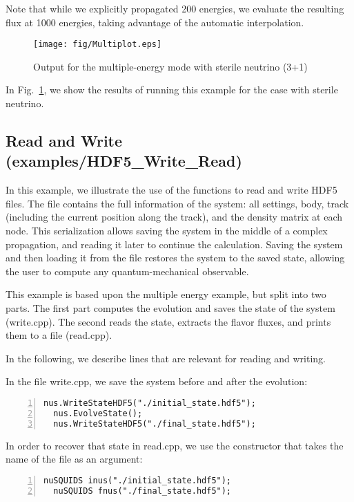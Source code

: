 \documentclass[3p,12pt]{elsarticle}
\newcommand{\ttf}{\ttfamily}
\begin{document}
Note that while we explicitly propagated 200 energies, we evaluate the resulting flux at 1000 energies, taking advantage of the automatic interpolation. 

\begin{figure}[h!]
  \label{fig:multimode}
  \centering
  \texttt{[image: fig/Multiplot.eps]} 
  \caption{Output for the multiple-energy mode with sterile neutrino (3+1)} 
\end{figure}
 
In Fig.~\ref{fig:multimode}, we show the results of running this example
for the case with sterile neutrino.

\subsection{Read and Write \textnormal{({\ttf examples/HDF5\_Write\_Read})}}
\label{sec:readwrite}
In this example, we illustrate the use of the functions to
read and write {\ttf HDF5} files. The file contains the full
information of the system: all settings, body, track (including the
current position along the track), and the density matrix at each node.
This serialization allows saving the system
in the middle of a complex propagation, and reading it later to continue
the calculation. Saving the system and then loading it from
the file restores the system to the saved state, allowing the user to
compute any quantum-mechanical observable.

This example is based upon the multiple energy example, but
split into two parts. The first part computes the evolution and saves the
state of the system ({\ttf write.cpp}). The second reads the
state, extracts the flavor fluxes, and prints them to a file ({\ttf read.cpp}).

In the following, we describe lines that are relevant for reading and writing.

In the file {\ttf write.cpp}, we save the system before and after the
evolution:
\begin{lstlisting}[frame=leftline, numbers =
  left,breaklines=true,label = ex:sin1]
  nus.WriteStateHDF5("./initial_state.hdf5");
  nus.EvolveState();
  nus.WriteStateHDF5("./final_state.hdf5");
\end{lstlisting}

In order to recover that state in {\ttf read.cpp}, we use the
constructor that takes the name of the file as an argument:

\begin{lstlisting}[frame=leftline, numbers =
  left,breaklines=true,label = ex:sin1]
  nuSQUIDS inus("./initial_state.hdf5");
  nuSQUIDS fnus("./final_state.hdf5"); 
\end{lstlisting}
\end{document}
